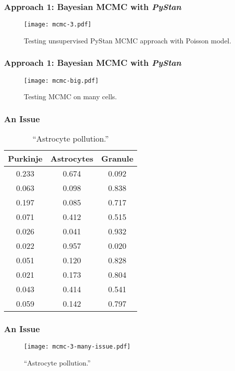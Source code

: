 \documentclass{beamer}
\newcommand{\importfig}[1]{{#1.tex}}
\begin{document}
\begin{frame}
    \frametitle{Approach 1: Bayesian MCMC with \textit{PyStan}}
    \begin{figure}[!htbp]
        \centering
        \texttt{[image: mcmc-3.pdf]}
        \caption{Testing unsupervised PyStan MCMC approach with Poisson model.}
    \end{figure}
\end{frame}

\begin{frame}
    \frametitle{Approach 1: Bayesian MCMC with \textit{PyStan}}
    \begin{figure}[!htbp]
        \centering
        \texttt{[image: mcmc-big.pdf]}
        \caption{Testing MCMC on many cells.}
    \end{figure}
\end{frame}


\begin{frame}
    \frametitle{An Issue}
    \begin{table}
        \centering
        \begin{tabular}{c | c | c}
            \textbf{Purkinje} & \textbf{Astrocytes} & \textbf{Granule}\\\hline
            0.233 & 0.674 & 0.092\\
            0.063 & \alert{0.098} & \alert{0.838}\\
            0.197 & 0.085 & 0.717\\
            0.071 & 0.412 & 0.515\\
            0.026 & 0.041 & 0.932\\
            0.022 & 0.957 & 0.020\\
            0.051 & \alert{0.120} & \alert{0.828}\\
            0.021 & \alert{0.173} & \alert{0.804}\\
            0.043 & 0.414 & 0.541\\
            0.059 & \alert{0.142} & \alert{0.797}\\
        \end{tabular}
        \caption{``Astrocyte pollution.''}
    \end{table}
\end{frame}

\begin{frame}
    \frametitle{An Issue}
    \begin{figure}[!htbp]
        \centering
        \texttt{[image: mcmc-3-many-issue.pdf]}
        \caption{``Astrocyte pollution.''}
    \end{figure}
\end{frame}
\end{document}
